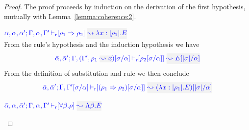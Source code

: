 \begin{proof}
The proof proceeds by induction on the derivation of the first hypothesis, mutually with Lemma~\ref{lemma:coherence:2}.
\begin{description}
\setlength{\itemsep}{1em}

\item[\fbox{\rref{R-IAbs}}]\quad$\drres{\bar{\alpha},\alpha,\bar{\alpha}'}{\tenv,\alpha,\tenv'}{\rulet_1 \To \rulet_2}{\abs{x}{|\rulet_1|}{E}}$ \\

From the rule's hypothesis and the induction hypothesis we have
\begin{equation*}
\drres{\bar{\alpha},\bar{\alpha}'}{\tenv,(\tenv',\ie{\rulet_1}{x})[\suty/\alpha]}{\rulet_2[\suty/\alpha]}{E[|\suty|/\alpha]}
\end{equation*}
From the definition of substitution and rule  we then conclude
\begin{equation*}
\drres{\bar{\alpha},\bar{\alpha}'}{\tenv,\tenv'[\suty/\alpha]}{(\rulet_1 \iarrow \rulet_2)[\suty/\alpha]}{(\abs{x}{\etrans{\rulet_1}}{E})[|\suty|/\alpha]}
\end{equation*}

\item[\fbox{\rref{R-TAbs}}]\quad$\drres{\bar{\alpha},\alpha,\bar{\alpha}'}{\tenv,\alpha,\tenv'}{\tall{\beta}{\rulet}}{\Abs{\beta}{E}}$\\


\end{description}
\end{proof}
